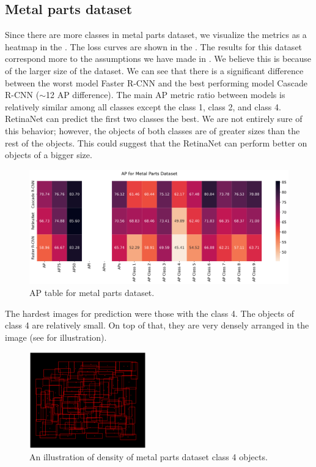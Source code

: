 \subsection*{Metal parts dataset}
Since there are more classes in metal parts dataset, we visualize the metrics
as a heatmap in the . The loss curves are shown in
the . The results for this dataset correspond more to
the assumptions we have made in . We believe this is
because of the larger size of the dataset. We can see that there is a
significant difference between the worst model Faster R-CNN and the best
performing model Cascade R-CNN (\small$\sim$\normalsize12 AP difference). The
main AP metric ratio between models is relatively similar among all classes
except the class 1, class 2, and class 4. RetinaNet can predict the first two
classes the best. We are not entirely sure of this behavior; however, the
objects of both classes are of greater sizes than the rest of the objects. This
could suggest that the RetinaNet can perform better on objects of
a bigger size.

\begin{figure}[H]
	\includegraphics[width=\linewidth]{Sources/Figures/metal/metal_ap.png}
	\caption{AP table for metal parts dataset.}
	\label{fig:metal_ap}
\end{figure}

The hardest images for prediction were those with the class 4. The objects of
class 4 are relatively small. On top of that, they are very densely arranged in
the image (see  for illustration).

\begin{figure}[H]
	\centering
	\includegraphics[width=0.45\textwidth]{Sources/Figures/metal/example.png}
	\caption{An illustration of density of metal parts dataset class 4
		objects.}
	\label{fig:metal_example}
\end{figure}

